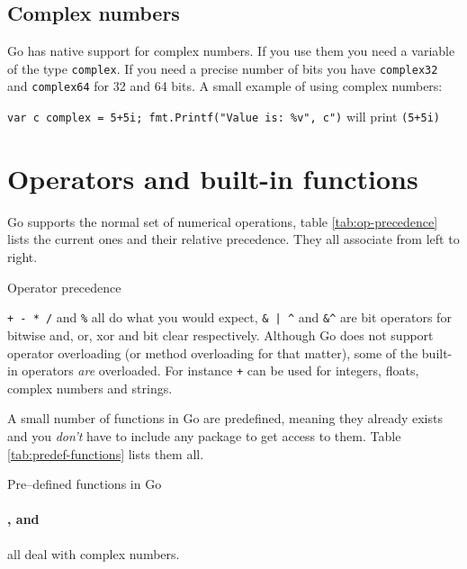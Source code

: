 \showremarks
\subsection{Complex numbers}
Go has native support for complex numbers. If you 
use them you need a variable of the type \lstinline{complex}. If
you need a precise number of bits you have \lstinline{complex32} and
\lstinline{complex64} for 32 and 64 bits. A small example of using complex numbers:

\lstinline{var c complex = 5+5i; fmt.Printf("Value is: %v", c")}\newline
will print\newline
\indent\lstinline{(5+5i)}

\section{Operators and built-in functions}
Go supports the normal set of numerical operations,
table \ref{tab:op-precedence}
lists the current ones and their relative precedence. They
all associate from left to right.

\begin{table}[H]
\begin{center}
\caption{Operator precedence}
\label{tab:op-precedence}

\end{center}
\end{table}
\verb|+ - * /| and \verb|%| all do what you would expect,
\verb!& | ^!
and \verb!&^! are bit operators for bitwise and, or, xor and bit clear 
respectively.
Although Go does not support operator overloading (or method
overloading for that matter), some of the built-in
operators \emph{are} overloaded. For instance \texttt{+} can be used for integers,
floats, complex numbers and strings.\hfill

A small number of functions in Go are predefined, meaning they already
exists and you \emph{don't} have to include any package to get
access to them. Table \ref{tab:predef-functions} lists them all.

\begin{table}[H]
\begin{center}
\caption{Pre--defined functions in Go}
\label{tab:predef-functions}

\end{center}
\end{table}

\paragraph{,  and } all deal with
complex numbers.


